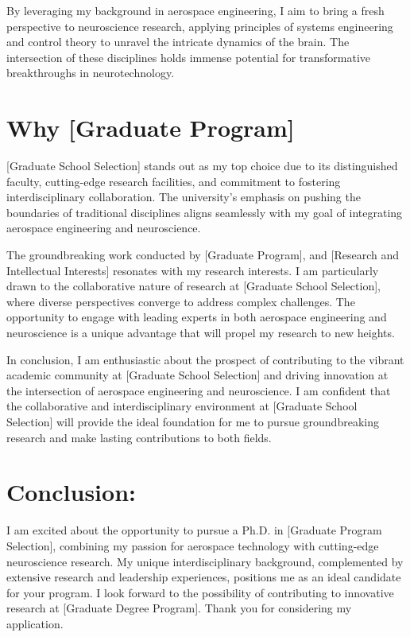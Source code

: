 \documentclass[letterpaper,10pt]{article}
\begin{document}
By leveraging my background in aerospace engineering, I aim to bring a fresh perspective to neuroscience research, applying principles of systems engineering and control theory to unravel the intricate dynamics of the brain. The intersection of these disciplines holds immense potential for transformative breakthroughs in neurotechnology.


\section*{Why [Graduate Program]}
[Graduate School Selection] stands out as my top choice due to its distinguished faculty, cutting-edge research facilities, and commitment to fostering interdisciplinary collaboration. The university's emphasis on pushing the boundaries of traditional disciplines aligns seamlessly with my goal of integrating aerospace engineering and neuroscience.

The groundbreaking work conducted by [Graduate Program], and [Research and Intellectual Interests] resonates with my research interests. I am particularly drawn to the collaborative nature of research at [Graduate School Selection], where diverse perspectives converge to address complex challenges. The opportunity to engage with leading experts in both aerospace engineering and neuroscience is a unique advantage that will propel my research to new heights.

In conclusion, I am enthusiastic about the prospect of contributing to the vibrant academic community at [Graduate School Selection] and driving innovation at the intersection of aerospace engineering and neuroscience. I am confident that the collaborative and interdisciplinary environment at [Graduate School Selection] will provide the ideal foundation for me to pursue groundbreaking research and make lasting contributions to both fields.


\section*{Conclusion:}
I am excited about the opportunity to pursue a Ph.D. in [Graduate Program Selection], combining my passion for aerospace technology with cutting-edge neuroscience research. My unique interdisciplinary background, complemented by extensive research and leadership experiences, positions me as an ideal candidate for your program. I look forward to the possibility of contributing to innovative research at [Graduate Degree Program]. Thank you for considering my application.
\end{document}
